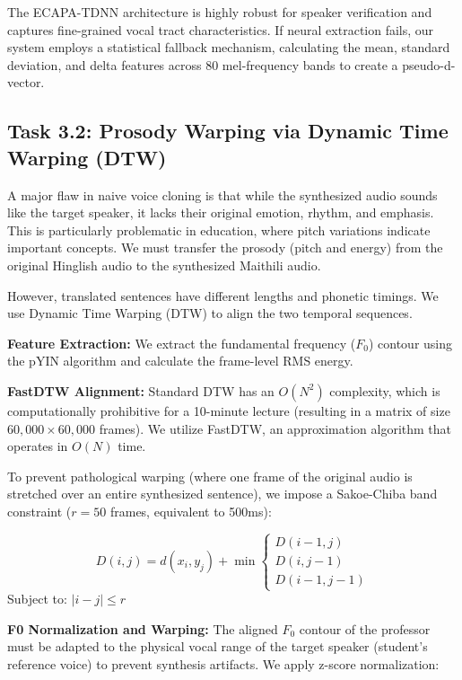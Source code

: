 \documentclass[conference]{IEEEtran}
\begin{document}
The ECAPA-TDNN architecture is highly robust for speaker verification and captures fine-grained vocal tract characteristics. If neural extraction fails, our system employs a statistical fallback mechanism, calculating the mean, standard deviation, and delta features across 80 mel-frequency bands to create a pseudo-d-vector.

\subsection{Task 3.2: Prosody Warping via Dynamic Time Warping (DTW)}

A major flaw in naive voice cloning is that while the synthesized audio sounds like the target speaker, it lacks their original emotion, rhythm, and emphasis. This is particularly problematic in education, where pitch variations indicate important concepts. We must transfer the prosody (pitch and energy) from the original Hinglish audio to the synthesized Maithili audio.

However, translated sentences have different lengths and phonetic timings. We use Dynamic Time Warping (DTW) to align the two temporal sequences.

\textbf{Feature Extraction:} We extract the fundamental frequency ($F_0$) contour using the pYIN algorithm and calculate the frame-level RMS energy.

\textbf{FastDTW Alignment:} Standard DTW has an $O(N^2)$ complexity, which is computationally prohibitive for a 10-minute lecture (resulting in a matrix of size $60,000 \times 60,000$ frames). We utilize FastDTW, an approximation algorithm that operates in $O(N)$ time.

To prevent pathological warping (where one frame of the original audio is stretched over an entire synthesized sentence), we impose a Sakoe-Chiba band constraint ($r=50$ frames, equivalent to 500ms):

\begin{equation}
D(i,j) = d(x_i, y_j) + \min\begin{cases} D(i-1, j) \\ D(i, j-1) \\ D(i-1, j-1) \end{cases}
\end{equation}
Subject to: $|i - j| \leq r$

\textbf{F0 Normalization and Warping:} The aligned $F_0$ contour of the professor must be adapted to the physical vocal range of the target speaker (student's reference voice) to prevent synthesis artifacts. We apply z-score normalization:
\end{document}
